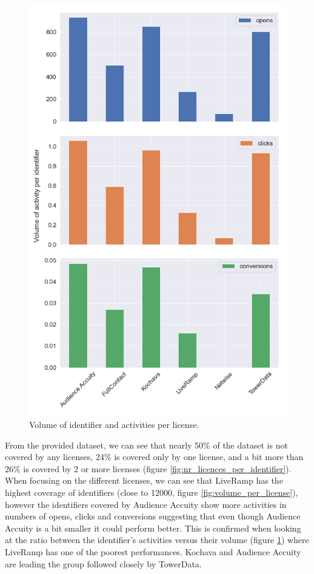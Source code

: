 \documentclass[11pt]{article} %
\begin{document}
\begin{figure}[h!]
  \includegraphics[width=0.8\linewidth]{../outputs/volume_per_identifier_per_license.png}
  \caption{Volume of identifier and activities per license.}
  \label{fig:volume_per_id_per_license}
\end{figure}

From the provided dataset, we can see that nearly 50\% of the dataset is not covered by any licenses, 24\% is covered only by one license, and a bit more than 26\% is covered by 2 or more licenses (figure \ref{fig:nr_licences_per_identifier}).\\

When focusing on the different licenses, we can see that LiveRamp has the highest coverage of identifiers (close to 12000, figure \ref{fig:volume_per_license}), however the identifiers covered by Audience Accuity show more activities in numbers of opens, clicks and conversions suggesting that even though Audience Accuity is a bit smaller it could perform better. This is confirmed when looking at the ratio between the identifier's activities versus their volume (figure \ref{fig:volume_per_id_per_license}) where LiveRamp has one of the poorest performances. Kochava and Audience Accuity are leading the group followed closely by TowerData.\\
\end{document}
